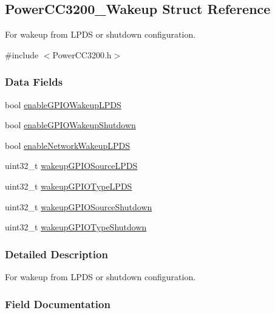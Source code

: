 \subsection{Power\+C\+C3200\+\_\+\+Wakeup Struct Reference}
\label{struct_power_c_c3200___wakeup}


For wakeup from L\+P\+D\+S or shutdown configuration.  




{\ttfamily \#include $<$Power\+C\+C3200.\+h$>$}

\subsubsection*{Data Fields}
\begin{DoxyCompactItemize}
\item 
bool \hyperlink{struct_power_c_c3200___wakeup_adad859f6991780ddd2200af8bc878e9e}{enable\+G\+P\+I\+O\+Wakeup\+L\+P\+D\+S}
\item 
bool \hyperlink{struct_power_c_c3200___wakeup_ad70641bb61c3c752dcd0516b994b8fa7}{enable\+G\+P\+I\+O\+Wakeup\+Shutdown}
\item 
bool \hyperlink{struct_power_c_c3200___wakeup_ae6de85aff35293b4d1a0ecea0e1950f1}{enable\+Network\+Wakeup\+L\+P\+D\+S}
\item 
uint32\+\_\+t \hyperlink{struct_power_c_c3200___wakeup_a559555b4277d254b9c6e3c28aa1dd837}{wakeup\+G\+P\+I\+O\+Source\+L\+P\+D\+S}
\item 
uint32\+\_\+t \hyperlink{struct_power_c_c3200___wakeup_adf6932c27b5fca7853c1362f279bb38e}{wakeup\+G\+P\+I\+O\+Type\+L\+P\+D\+S}
\item 
uint32\+\_\+t \hyperlink{struct_power_c_c3200___wakeup_aea173877a30709d74376fbbfc7dfa16f}{wakeup\+G\+P\+I\+O\+Source\+Shutdown}
\item 
uint32\+\_\+t \hyperlink{struct_power_c_c3200___wakeup_a8d9bfd8ed6589bb88d7f70a1dec22bbb}{wakeup\+G\+P\+I\+O\+Type\+Shutdown}
\end{DoxyCompactItemize}


\subsubsection{Detailed Description}
For wakeup from L\+P\+D\+S or shutdown configuration. 

\subsubsection{Field Documentation}
